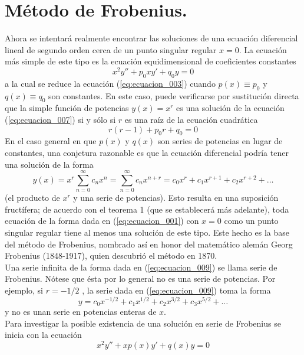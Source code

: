 \section{Método de Frobenius.}
Ahora se intentará realmente encontrar las soluciones de una ecuación diferencial lineal de segundo orden cerca de un punto singular regular $x = 0$. La ecuación más simple de este tipo es la ecuación equidimensional de coeficientes constantes
\begin{equation}
x^{2} y'' + p_{0} xy' + q_{0} y = 0
\label{eq:ecuacion_007}
\end{equation}
a la cual se reduce la ecuación (\ref{eq:ecuacion_003}) cuando $p(x) \equiv p_{0}$ y $q(x) \equiv q_{0}$ son constantes. En este caso, puede verificarse por sustitución directa que la simple función de potencias $y(x) = x^{r}$ es una solución de la ecuación (\ref{eq:ecuacion_007}) si y sólo si $r$ es una raíz de la ecuación cuadrática
\begin{equation}
r(r-1) + p_{0} r + q_{0} = 0
\label{eq:ecuacion_008}
\end{equation}
En el caso general en que $p(x)$ y $q(x)$ son series de potencias en lugar de constantes, una conjetura razonable es que la ecuación diferencial podría tener una solución de la forma
\begin{equation}
y(x) = x^{r} \sum_{n=0}^{\infty} c_{n} x^{n} =  \sum_{n=0}^{\infty} c_{n} x^{n+r} =  c_{0} x^{r} + c_{1} x^{r+1} +c_{2} x^{r+2} + \ldots
\label{eq:ecuacion_009}
\end{equation}
(el producto de $x^{r}$ y una serie de potencias). Esto resulta en una suposición fructífera; de acuerdo con el teorema 1 (que se establecerá más adelante), toda ecuación de la forma dada en (\ref{eq:ecuacion_001}) con $x = 0$ como un punto singular regular tiene al menos una solución de este tipo. Este hecho es la base del método de Frobenius, nombrado así
en honor del matemático alemán Georg Frobenius (1848-1917), quien descubrió el método en 1870.
\\
Una serie infinita de la forma dada en (\ref{eq:ecuacion_009}) se llama serie de Frobenius. Nótese que ésta por lo general no es una serie de potencias. Por ejemplo, si $r = - 1/2$ , la serie dada en (\ref{eq:ecuacion_009}) toma la forma
\[ y =  c_{0} x^{-1/2} + c_{1} x^{1/2} + c_{2} x^{3/2} + c_{3} x^{5/2} + \ldots \]
y no es unan serie en potencias enteras de $x$.
\\
Para investigar la posible existencia de una solución en serie de Frobenius se inicia con la ecuación
\begin{equation}
x^{2} y'' + x p(x) y' + q(x) y = 0
\label{eq:ecuacion_010}
\end{equation}
